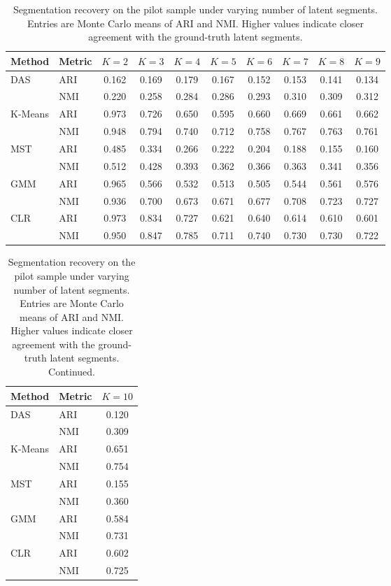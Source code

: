 \begin{table}[htbp]
\centering
\caption{Segmentation recovery on the pilot sample under varying number of latent segments. Entries are Monte Carlo means of ARI and NMI. Higher values indicate closer agreement with the ground-truth latent segments.}
\label{tab:app-ari-nmi-varying-K}
\begin{tabular}{llcccccccc}
\toprule
Method & Metric & $K=2$ & $K=3$ & $K=4$ & $K=5$ & $K=6$ & $K=7$ & $K=8$ & $K=9$ \\
\midrule
DAS & ARI & 0.162 & 0.169 & 0.179 & 0.167 & 0.152 & 0.153 & 0.141 & 0.134 \\
 & NMI & 0.220 & 0.258 & 0.284 & 0.286 & 0.293 & 0.310 & 0.309 & 0.312 \\
\addlinespace
K-Means & ARI & 0.973 & 0.726 & 0.650 & 0.595 & 0.660 & 0.669 & 0.661 & 0.662 \\
 & NMI & 0.948 & 0.794 & 0.740 & 0.712 & 0.758 & 0.767 & 0.763 & 0.761 \\
\addlinespace
MST & ARI & 0.485 & 0.334 & 0.266 & 0.222 & 0.204 & 0.188 & 0.155 & 0.160 \\
 & NMI & 0.512 & 0.428 & 0.393 & 0.362 & 0.366 & 0.363 & 0.341 & 0.356 \\
\addlinespace
GMM & ARI & 0.965 & 0.566 & 0.532 & 0.513 & 0.505 & 0.544 & 0.561 & 0.576 \\
 & NMI & 0.936 & 0.700 & 0.673 & 0.671 & 0.677 & 0.708 & 0.723 & 0.727 \\
\addlinespace
CLR & ARI & 0.973 & 0.834 & 0.727 & 0.621 & 0.640 & 0.614 & 0.610 & 0.601 \\
 & NMI & 0.950 & 0.847 & 0.785 & 0.711 & 0.740 & 0.730 & 0.730 & 0.722 \\
\bottomrule
\end{tabular}
\end{table}

\begin{table}[htbp]
\centering
\caption{Segmentation recovery on the pilot sample under varying number of latent segments. Entries are Monte Carlo means of ARI and NMI. Higher values indicate closer agreement with the ground-truth latent segments. Continued.}
\label{tab:app-ari-nmi-varying-K-cont}
\begin{tabular}{llc}
\toprule
Method & Metric & $K=10$ \\
\midrule
DAS & ARI & 0.120 \\
 & NMI & 0.309 \\
\addlinespace
K-Means & ARI & 0.651 \\
 & NMI & 0.754 \\
\addlinespace
MST & ARI & 0.155 \\
 & NMI & 0.360 \\
\addlinespace
GMM & ARI & 0.584 \\
 & NMI & 0.731 \\
\addlinespace
CLR & ARI & 0.602 \\
 & NMI & 0.725 \\
\bottomrule
\end{tabular}
\end{table}
